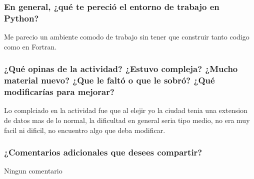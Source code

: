\documentclass{article}
\begin{document}
\subsubsection{En general, ¿qué te pereció el entorno de trabajo en Python?}
Me parecio un ambiente comodo de trabajo sin tener que construir tanto codigo como en Fortran.
\subsubsection{¿Qué opinas de la actividad? ¿Estuvo compleja? ¿Mucho material nuevo? ¿Que le faltó o que le sobró? ¿Qué modificarías para mejorar?}
Lo complciado en la actividad fue que al elejir yo la ciudad tenia una extension de datos mas de lo normal, la dificultad en general seria tipo medio, no era muy facil ni dificil, no encuentro algo que deba modificar.
\subsubsection{¿Comentarios adicionales que desees compartir?}
Ningun comentario
\end{document}
